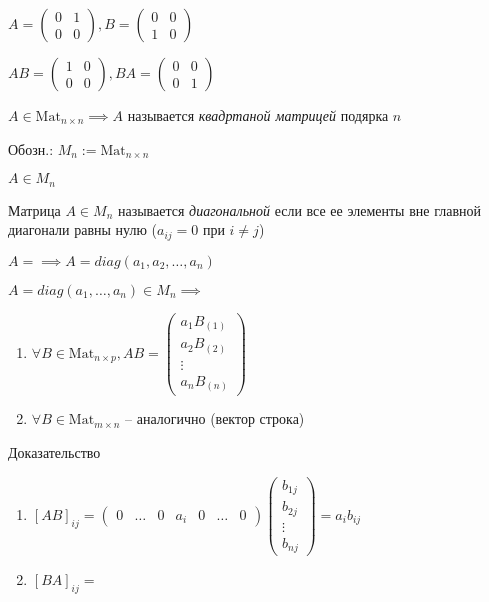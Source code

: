 $A = \begin{pmatrix} 0 & 1 \\ 0 & 0 \end{pmatrix}, 
B = \begin{pmatrix} 0 & 0 \\ 1 & 0 \end{pmatrix}$

$AB = \begin{pmatrix}1 & 0 \\ 0 & 0\end{pmatrix}, 
BA = \begin{pmatrix}0 & 0 \\ 0 & 1\end{pmatrix}$

\begin{definition}
$A \in \text{Mat}_{n \times n} \implies A$ называется \textit{квадртаной матрицей} подярка $n$
\end{definition}

Обозн.: $M_n := \text{Mat}_{n \times n}$

$A \in M_n$

\begin{definition}
    Матрица $A \in M_n$ называется \textit{диагональной} если все ее элементы вне главной диагонали равны нулю ($a_{ij} = 0$ при $i \neq j$)
\end{definition}

$A = \implies A = diag(a_1, a_2, \dots, a_n)$

\begin{lemma}
    $A = diag(a_1, \dots, a_n) \in M_n \implies$
    \begin{enumerate}
    \item $\forall B \in \text{Mat}_{n \times p}, AB = \begin{pmatrix}
            a_1 B_{(1)} \\
            a_2 B_{(2)} \\
            \vdots \\
            a_n B_{(n)} 
        \end{pmatrix}$
    \item $\forall B \in \text{Mat}_{m \times n}$ -- аналогично (вектор строка)
    \end{enumerate}
\end{lemma}

Доказательство
\begin{enumerate}
\item $[AB]_{ij} = \begin{pmatrix} 0 & \dots & 0 & a_i & 0 & \dots & 0\end{pmatrix} \begin{pmatrix} b_{1j} \\ b_{2j} \\ \vdots \\ b_{nj} \end{pmatrix} = a_i b_{ij} $
\item $[BA]_{ij} = $ 
\end{enumerate}

